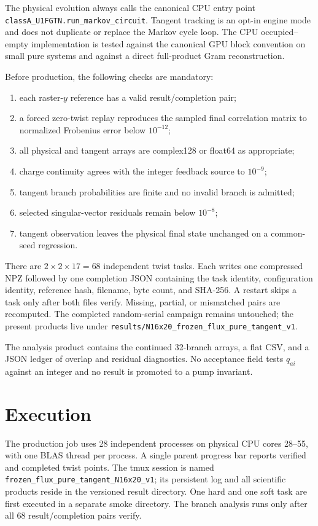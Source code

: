 \documentclass[aps,prb,twocolumn,floatfix,nofootinbib,superscriptaddress]{revtex4-2}
\newcommand{\code}[1]{\texttt{#1}}
\begin{document}
The physical evolution always calls the canonical CPU entry point
\code{classA\_U1FGTN.run\_markov\_circuit}.  Tangent tracking is an opt-in
engine mode and does not duplicate or replace the Markov cycle loop.  The CPU
occupied--empty implementation is tested against the canonical GPU block
convention on small pure systems and against a direct full-product Gram
reconstruction.

Before production, the following checks are mandatory:
\begin{enumerate}
  \item each raster-$y$ reference has a valid result/completion pair;
  \item a forced zero-twist replay reproduces the sampled final correlation
        matrix to normalized Frobenius error below $10^{-12}$;
  \item all physical and tangent arrays are complex128 or float64 as
        appropriate;
  \item charge continuity agrees with the integer feedback source to
        $10^{-9}$;
  \item tangent branch probabilities are finite and no invalid branch is
        admitted;
  \item selected singular-vector residuals remain below $10^{-8}$;
  \item tangent observation leaves the physical final state unchanged on a
        common-seed regression.
\end{enumerate}

There are $2\times2\times17=68$ independent twist tasks.  Each writes one
compressed NPZ followed by one completion JSON containing the task identity,
configuration identity, reference hash, filename, byte count, and SHA-256.
A restart skips a task only after both files verify.  Missing, partial, or
mismatched pairs are recomputed.  The completed random-serial campaign remains
untouched; the present products live under
\code{results/N16x20\_frozen\_flux\_pure\_tangent\_v1}.

The analysis product contains the continued 32-branch arrays, a flat CSV, and
a JSON ledger of overlap and residual diagnostics.  No acceptance field tests
$q_{ai}$ against an integer and no result is promoted to a pump invariant.

\section{Execution}

The production job uses 28 independent processes on physical CPU cores
28--55, with one BLAS thread per process.  A single parent progress bar reports
verified and completed twist points.  The tmux session is named
\code{frozen\_flux\_pure\_tangent\_N16x20\_v1}; its persistent log and all
scientific products reside in the versioned result directory.  One hard and
one soft task are first executed in a separate smoke directory.  The branch
analysis runs only after all 68 result/completion pairs verify.
\end{document}
